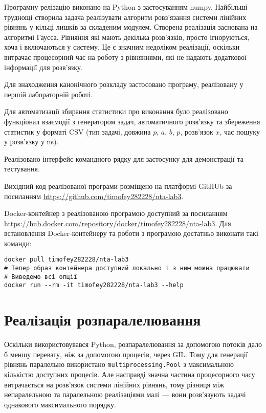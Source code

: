 \documentclass[14pt,a4paper,final]{extreport}
\begin{document}
Програмну релізацію виконано на Python з застосуванням numpy. Найбільші труднощі створила задача реалізувати алгоритм ровз'язання системи
лінійних рівнянь у кільці лишків за складеним модулем. Створена реалізація заснована на алгоритмі Гаусса. Рівняння які мають декілька розв'язків,
просто ігноруються, хоча і включаються у систему. Це є значним недоліком реалізації, оскільки витрачає процесорний час на роботу з рівняннями,
які не надають додаткової інформації для розв'язку.

Для знаходження канонічного розкладу застосовано програму, реалізовану у першій лабораторній роботі.

Для автоматизації збирання статистики про виконання було реалізовано функціонал взаємодії з генератором задач, автоматичного розв'язку та збереження 
статистик у форматі CSV (тип задачі, довжина $p$, $a$, $b$, $p$, розв'язок $x$, час пошуку у розв'язку у ns).

Реалізовано інтерфейс командного рядку для застосунку для демонстрації та тестування.

Вихідний код реалізованої програми розміщено на платформі GitHUb за посиланням \href{https://github.com/timofey282228/nta-lab3}{https://github.com/timofey282228/nta-lab3}.

Docker-контейнер з реалізованою програмою доступний за посиланням \url{https://hub.docker.com/repository/docker/timofey282228/nta-lab3}. 
Для встановлення Docker-контейнеру та роботи з програмою достатньо виконати такі команди:

\begin{verbatim}
docker pull timofey282228/nta-lab3
# Тепер образ контейнера доступний локально і з ним можна працювати
# Виведемо всі опції
docker run --rm -it timofey282228/nta-lab3 --help
\end{verbatim}

\section*{Реалізація розпаралелювання}

Оскільки використовувався Python, розпаралелювання за допомогою потоків дало б меншу перевагу, ніж за допомогою процесів, через GIL.
Тому для генерації рівнянь паралельно використано \verb|multiprocessing.Pool| з максимальною кількістю доступних процесів.
Але насправді значна частина процесорного часу витрачається на розв'язок системи лінійних рівнянь,
тому різниця між непаралельною та паралельною реалізаціями малі — вони розв'язують задачі однакового максимального порядку. 
\end{document}

